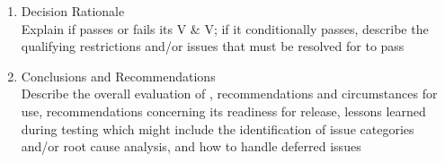 \begin{enumerate}
\begin{enumerate}
        \item Decision Rationale \\
        Explain if \progname{} passes or fails its V \& V; if it conditionally
        passes, describe the qualifying restrictions and/or issues that must be
        resolved for \progname{} to pass

        \item Conclusions and Recommendations \\
        Describe the overall evaluation of \progname{}, recommendations and
        circumstances for use, recommendations concerning its readiness for
        release, lessons learned during testing which might include the
        identification of issue categories and/or root cause analysis, and how
        to handle deferred issues

    \end{enumerate}

\end{enumerate}